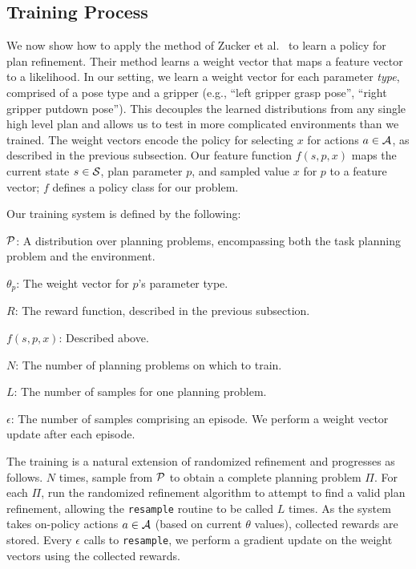 \subsection{Training Process}
We now show how to apply the method of Zucker et al.~\cite{workspacebias} to learn a policy
for plan refinement. Their method learns a weight vector that maps a feature vector to a
likelihood. In our setting, we learn a weight vector for each parameter
\emph{type}, comprised of a pose type and a gripper (e.g., ``left gripper grasp pose'', ``right
gripper putdown pose''). This decouples the learned distributions from any single
high level plan and allows us to test in more complicated environments than we
trained. The weight vectors encode the policy for selecting $x$ for actions $a \in \mathcal{A}$,
as described in the previous subsection. Our feature function $f(s, p, x)$ maps the current
state $s \in \mathcal{S}$, plan parameter $p$, and sampled value $x$ for $p$ to a feature vector; $f$
defines a policy class for our problem.

Our training system is defined by the following:
\begin{tightlist}
\item[$\mathcal{P}$:] A distribution over planning problems, encompassing both
the task planning problem and the environment.
\item[$\theta_{p}$:] The weight vector for $p$'s parameter type.
\item[$R$:] The reward function, described in the previous subsection.
\item[$f(s, p, x)$:] Described above.
\item[$N$:] The number of planning problems on which to train.
\item[$L$:] The number of samples for one planning problem.
\item[$\epsilon$:] The number of samples comprising an episode. We perform
a weight vector update after each episode.
\end{tightlist}

The training is a natural extension of randomized
refinement and progresses as follows. $N$ times, sample from $\mathcal{P}$ to obtain
a complete planning problem $\Pi$. For each $\Pi$, run the randomized refinement
algorithm to attempt to find a valid plan refinement, allowing the \texttt{resample}
routine to be called $L$ times. As the system takes on-policy actions $a \in \mathcal{A}$ (based on
current $\theta$ values), collected
rewards are stored. Every $\epsilon$ calls to
\texttt{resample}, we perform a gradient update on the weight vectors using the
collected rewards.

